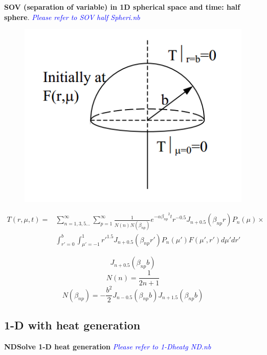 \begin{appendices}
\begin{example}
\textbf{SOV (separation of variable) in 1D spherical space and time: half sphere}. \textcolor{blue} {\emph{Please refer to SOV half Spheri.nb}}
\begin{figure}[H]
  \centering
    \includegraphics[scale=0.5]{figures/appendixA/8}
\end{figure}
\begin{equation*}
\begin{aligned}
T(r,\mu,t)=&\sum_{n=1,3,5\dots}^{\infty}\sum_{p=1}^{\infty} \frac{1}{N(n)N(\beta_{np})}
e^{-\alpha{\beta_{np}}^2t}r^{-0.5}J_{n+0.5}(\beta_{np}r)P_n(\mu)\times\\
&\int_{r'=0}^{b}\int_{\mu'=-1}^{1} {r'}^{1.5}J_{n+0.5}(\beta_{np}r')P_n(\mu')
F(\mu',r')d\mu'dr'
\end{aligned}
\end{equation*}

$$J_{n+0.5}(\beta_{np}b)$$
$$N(n)=\frac{1}{2n+1}$$
$$N(\beta_{np})=-\frac{b^2}{2}J_{n-0.5}(\beta_{np}b)J_{n+1.5}(\beta_{np}b)$$
\end{example}



\subsection{1-D with heat generation}
\begin{example}
\textbf{NDSolve 1-D heat generation} \textcolor{blue} {\emph{Please refer to 1-Dheatg ND.nb}}
\end{example}


\end{appendices}
